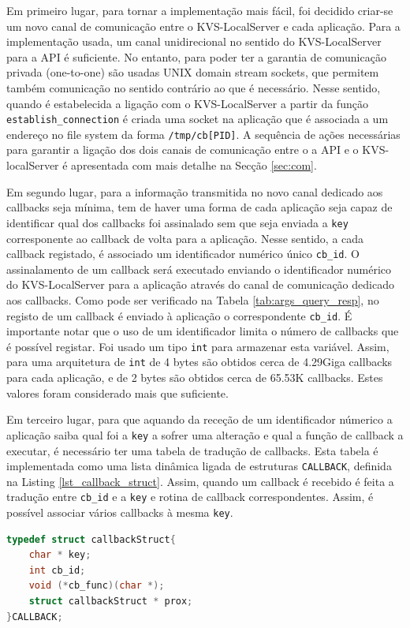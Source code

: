 Em primeiro lugar, para tornar a implementação mais fácil, foi decidido criar-se um novo canal de comunicação entre o KVS-LocalServer e cada aplicação. Para a implementação usada, um canal unidirecional no sentido do KVS-LocalServer para a API é suficiente. No entanto, para poder ter a garantia de comunicação privada (one-to-one) são usadas UNIX domain stream sockets, que permitem também comunicação no sentido contrário ao que é necessário. Nesse sentido, quando é estabelecida a ligação com o KVS-LocalServer a partir da função \texttt{establish\_connection} é criada uma socket na aplicação que é associada a um endereço no file system da forma \texttt{/tmp/cb[PID]}. A sequência de ações necessárias para garantir a ligação dos dois canais de comunicação entre o a API e o KVS-localServer é apresentada com mais detalhe na Secção \ref{sec:com}.

Em segundo lugar, para a informação transmitida no novo canal dedicado aos callbacks seja mínima, tem de haver uma forma de cada aplicação seja capaz de identificar qual dos callbacks  foi assinalado sem que seja enviada a \texttt{key} corresponente ao callback de volta para a aplicação. Nesse sentido, a cada callback registado, é associado um identificador numérico único \texttt{cb\_id}. O assinalamento de um callback será executado enviando o identificador numérico do KVS-LocalServer para a aplicação através do canal de comunicação dedicado aos callbacks. Como pode ser verificado na Tabela \ref{tab:args_query_resp}, no registo de um callback é enviado à aplicação o correspondente \texttt{cb\_id}. É importante notar que o uso de um identificador limita o número de callbacks que é possível registar. Foi usado um tipo \texttt{int} para armazenar esta variável. Assim, para uma arquitetura de \texttt{int} de 4 bytes são obtidos cerca de 4.29Giga callbacks para cada aplicação, e de 2 bytes são obtidos cerca de 65.53K callbacks. Estes valores foram considerado mais que suficiente.%

Em terceiro lugar, para que aquando da receção de um identificador númerico a aplicação saiba qual foi a \texttt{key} a sofrer uma alteração e qual a função de callback a executar, é necessário ter uma tabela de tradução de callbacks. Esta tabela é implementada como uma lista dinâmica ligada de estruturas \texttt{CALLBACK}, definida na Listing \ref{lst_callback_struct}. Assim, quando um callback é recebido é feita a tradução entre \texttt{cb\_id} e a \texttt{key} e rotina de callback correspondentes. Assim, é possível associar vários callbacks à mesma \texttt{key}.
\begin{lstlisting}[language=C,label={lst_callback_struct},caption=Estrutura \texttt{CALLBACK} na KVS-lib.]
typedef struct callbackStruct{
    char * key;
    int cb_id;
    void (*cb_func)(char *);
    struct callbackStruct * prox;
}CALLBACK;
\end{lstlisting}

